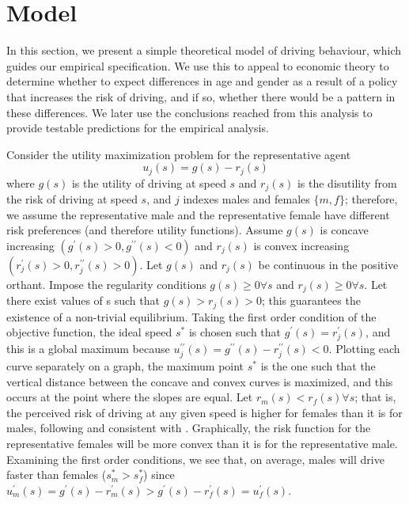 \section{Model}
\label{sec:Model}

In this section, we present a simple theoretical model of driving behaviour, 
%
which guides our empirical specification. 
%
We use this to appeal to economic theory to determine whether to expect 
differences in age and gender as a result of a policy that increases the risk of driving, 
and if so, whether there would be a pattern in these differences. 
% 
We later use the conclusions reached from this analysis 
to provide testable predictions for the empirical analysis.  

Consider the utility maximization problem 
for the representative agent
%
$$
	u_j (s) = g(s) - r_j (s)
$$
% 
where $g(s)$ is the utility of driving at speed $s$ 
and $r_j (s)$ is the disutility from the risk of driving at speed $s$, 
and $j$ indexes males and females $\{m,f\}$;
% 
therefore, we assume the representative male and the representative female 
have different risk preferences (and therefore utility functions). 
% 
Assume $g(s)$ is concave increasing $(g^{\prime} (s)>0, 
g^{\prime\prime} (s)<0)$ 
and $r_j (s)$ is convex increasing $(r_j^{\prime} (s)>0, r_j^{\prime\prime} (s)>0)$. 
Let $g(s)$ and $r_j (s)$ be continuous in the positive orthant. 
Impose the regularity conditions $g(s)\geq0 \forall s$ and $r_j (s)\geq0 \forall s$. 
Let there exist values of s such that $g(s)>r_j (s)>0$; 
this guarantees the existence of a non-trivial equilibrium. 
Taking the first order condition of the objective function, 
the ideal speed $s^*$ is chosen such that $g^{\prime} (s)=r_j^{\prime} (s)$, 
and this is a global maximum because 
$u_j^{\prime\prime} (s)=g^{\prime\prime} (s)-r_j^{\prime\prime} (s)<0$. 
Plotting each curve separately on a graph, 
the maximum point $s^*$ is the one such that 
the vertical distance between the concave and convex curves is maximized, 
and this occurs at the point where the slopes are equal. 
Let $r_m (s)<r_f (s)  \forall s$; 
that is, the perceived risk of driving at any given speed 
is higher for females than it is for males, 
following 
\citet{harris2006}
and consistent with
\citet{crosongneezy2009}.
Graphically, the risk function for the representative females will be more convex than it is for the representative male. 
Examining the first order conditions, 
we see that, on average, males will drive faster than females ($s_m^*>s_f^*$) 
since 
$u_m^{\prime} (s)
=g^{\prime} (s)-r_m^{\prime} (s)
>g^{\prime} (s)-r_f^{\prime} (s)
=u_f^{\prime} (s)$. \\


